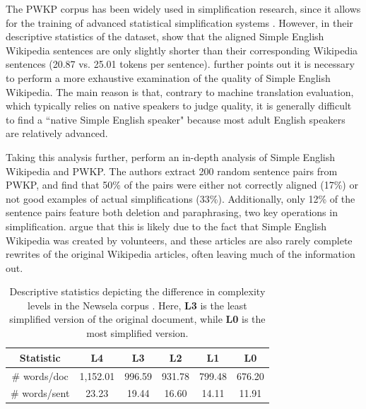 \documentclass[thesis.tex]{subfiles}
\begin{document}
The PWKP corpus has been widely used in simplification research, since it allows for the training of advanced statistical simplification systems \citep{woodsend2011learning,coster2011learning,wubben2012sentence}. However, in their descriptive statistics of the dataset, \cite{zhu2010monolingual} show that the aligned Simple English Wikipedia sentences are only slightly shorter than their corresponding Wikipedia sentences (20.87 vs. 25.01 tokens per sentence). \cite{siddharthan2014survey} further points out it is necessary to perform a more exhaustive examination of the quality of Simple English Wikipedia. The main reason is that, contrary to machine translation evaluation, which typically relies on native speakers to judge quality, it is generally difficult to find a ``native Simple English speaker" because most adult English speakers are relatively advanced. 

Taking this analysis further, \cite{xu2015problems} perform an in-depth analysis of Simple English Wikipedia and PWKP. The authors extract 200 random sentence pairs from PWKP, and find that 50\% of the pairs were either not correctly aligned (17\%) or not good examples of actual simplifications (33\%). Additionally, only 12\% of the sentence pairs feature both deletion and paraphrasing, two key operations in simplification. \cite{xu2015problems} argue that this is likely due to the fact that Simple English Wikipedia was created by volunteers, and these articles are also rarely complete rewrites of the original Wikipedia articles, often leaving much of the information out.

\begin{table}
\begin{center}
\begin{tabular}{|c|c|c|c|c|c|} \hline
Statistic & \textbf{L4} & \textbf{L3} & \textbf{L2} & \textbf{L1} & \textbf{L0} \\ \hline
\# words/doc & 1,152.01 & 996.59 & 931.78 & 799.48 & 676.20 \\
\# words/sent & 23.23 & 19.44 & 16.60 & 14.11 & 11.91 \\ \hline
\end{tabular}
\end{center}
\caption{\label{tab:newsela} Descriptive statistics depicting the difference in complexity levels in the Newsela corpus \citep{xu2015problems}. Here, \textbf{L3} is the least simplified version of the original document, while \textbf{L0} is the most simplified version.}
\end{table}
\end{document}
